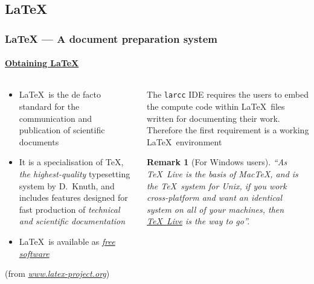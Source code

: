 \documentclass{beamer}
\newtheorem{remark}[theorem]{Remark}
\begin{document}
\subsection{\LaTeX}
\frame
{
  \frametitle{LaTeX --- A document preparation system}
  \framesubtitle{\href{http://latex-project.org/ftp.html}{\bf Obtaining LaTeX}}
  \footnotesize

\begin{columns}
	\begin{column}{6cm}
\begin{itemize}
\item 
\LaTeX\ is the \alert{de facto standard for} the communication and publication of \alert{scientific documents} 
\item 
It is a specialisation of \TeX, \emph{the highest-quality} typesetting system by D.~Knuth, and includes features designed for fast production of \emph{technical and scientific documentation} 
\item 
\LaTeX\ is available as \href{http://latex-project.org/ftp.html}{\emph{free software}}
\end{itemize}

\flushright
(from \href{http://www.latex-project.org/}{\emph{www.latex-project.org}})
	\end{column}
\pause
	\begin{column}{6cm}
	The \alert{\texttt{larcc} IDE} requires the users to embed the compute code within \LaTeX\ files written for documenting their work. Therefore the \alert{first requirement is a working \LaTeX\ environment} 
	
	\begin{remark}[For Windows users]
	``As \TeX\ Live is the basis of Mac\TeX, and is the \TeX\ system for Unix, if you work cross-platform and want an identical system on all of your machines, then \href{http://www.tug.org/texlive/}{\emph{\TeX\ Live}} is the way to go''.
	\end{remark}
	\end{column}
\end{columns}

}
\end{document}
